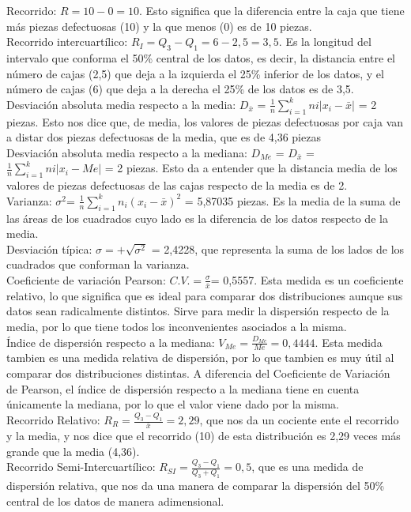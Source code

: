 \documentclass[a4paper,12pt]{article}
\begin{document}
Recorrido: $R=10 - 0 = 10$. Esto significa que la diferencia entre la caja que tiene más piezas defectuosas (10) y la que menos (0) es de 10 piezas.\\
Recorrido intercuartílico: $R_I = Q_3 - Q_1 = 6-2,5 = 3,5$. Es la longitud del intervalo que conforma el 50\% central de los datos, es decir, la distancia entre el número de cajas (2,5) que deja a la izquierda el 25\% inferior de los datos, y el número de cajas (6) que deja a la derecha el 25\% de los datos es de 3,5.\\
Desviación absoluta media respecto a la media: $D_\bar x$ = $\frac{1}{n}\sum\limits_{i = 1}^k ni|x_i - \bar x|$ = 2 piezas. Esto nos dice que, de media, los valores de piezas defectuosas por caja van a distar dos piezas defectuosas de la media, que es de 4,36 piezas\\
Desviación absoluta media respecto a la mediana: $D_{Me}$ = $D_\bar x$ = $\frac{1}{n}\sum\limits_{i = 1}^k ni|x_i - Me|$ = 2 piezas. Esto da a entender que la distancia media de los valores de piezas defectuosas de las cajas respecto de la media es de 2.\\
Varianza: $\sigma^2$= $\frac{1}{n}\sum\limits_{i=1}^kn_i(x_i-\bar x)^2$ = 5,87035 piezas. Es la media de la suma de las áreas de los cuadrados cuyo lado es la diferencia de los datos respecto de la media.\\
Desviación típica: $\sigma=+\sqrt{\sigma^2}$ = 2,4228, que representa la suma de los lados de los cuadrados que conforman la varianza.\\
Coeficiente de variación Pearson: $C.V.=\frac{\sigma}{\bar x}$= 0,5557. Esta medida es un coeficiente relativo, lo que significa que es ideal para comparar dos distribuciones aunque sus datos sean radicalmente distintos. Sirve para medir la dispersión respecto de la media, por lo que tiene todos los inconvenientes asociados a la misma.\\
Índice de dispersión respecto a la mediana: $V_{Me}= \frac{D_{Me}}{Me}=0,4444$. Esta medida tambien es una medida relativa de dispersión, por lo que tambien es muy útil al comparar dos distribuciones distintas. A diferencia del Coeficiente de Variación de Pearson, el índice de dispersión respecto a la mediana tiene en cuenta únicamente la mediana, por lo que el valor viene dado por la misma. \\
Recorrido Relativo: $R_R=\frac{Q_3-Q_1}{\bar x}=2,29$, que nos da un cociente ente el recorrido y la media, y nos dice que el recorrido (10) de esta distribución es 2,29 veces más grande que la media (4,36).\\
Recorrido Semi-Intercuartílico: $R_{SI}= \frac{Q_3-Q_1}{Q_3+Q_1}=0,5$, que es una medida de dispersión relativa, que nos da una manera de comparar la dispersión del 50\% central de los datos de manera adimensional.
\end{document}
